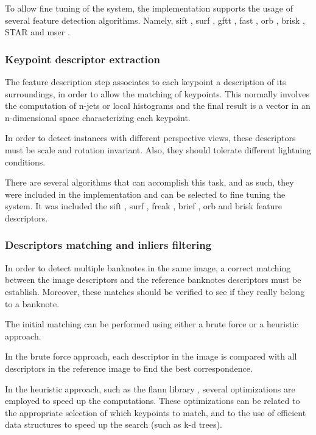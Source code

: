 To allow fine tuning of the system, the implementation supports the usage of several feature detection algorithms. Namely, \gls{sift} \cite{Lowe2004}, \gls{surf} \cite{Bay2006}, \gls{gftt} \cite{Shi1994}, \gls{fast} \cite{Rosten2006}, \gls{orb} \cite{Rublee2011}, \gls{brisk} \cite{Leutenegger2011}, STAR \cite{Agrawal2008} and \gls{mser} \cite{Matas2004}.


\subsubsection{Keypoint descriptor extraction}\label{sec:keypoint-descriptor-extraction}

The feature description step associates to each keypoint a description of its surroundings, in order to allow the matching of keypoints. This normally involves the computation of n-jets or local histograms and the final result is a vector in an n-dimensional space characterizing each keypoint.

In order to detect instances with different perspective views, these descriptors must be scale and rotation invariant. Also, they should tolerate different lightning conditions.

There are several algorithms that can accomplish this task, and as such, they were included in the implementation and can be selected to fine tuning the system. It was included the \gls{sift} \cite{Lowe2004}, \gls{surf} \cite{Bay2006}, \gls{freak} \cite{Alahi2012}, \gls{brief} \cite{Calonder2010}, \gls{orb} \cite{Rublee2011} and \gls{brisk} \cite{Leutenegger2011} feature descriptors.


\subsubsection{Descriptors matching and inliers filtering}\label{sec:descriptors-matching-and-inliers-filtering}

In order to detect multiple banknotes in the same image, a correct matching between the image descriptors and the reference banknotes descriptors must be establish. Moreover, these matches should be verified to see if they really belong to a banknote.

The initial matching can be performed using either a brute force or a heuristic approach.

In the brute force approach, each descriptor in the image is compared with all descriptors in the reference image to find the best correspondence.

In the heuristic approach, such as the \gls{flann} library \cite{Muja2009}, several optimizations are employed to speed up the computations. These optimizations can be related to the appropriate selection of which keypoints to match, and to the use of efficient data structures to speed up the search (such as k-d trees).

